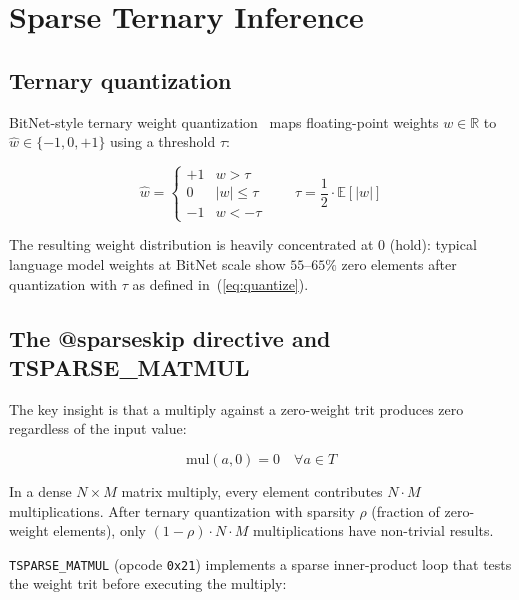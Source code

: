 \documentclass[journal,10pt,twocolumn]{IEEEtran}
\begin{document}
\section{Sparse Ternary Inference}
\label{sec:sparse}

\subsection{Ternary quantization}

BitNet-style ternary weight quantization~\cite{ma2024era} maps floating-point
weights $w \in \mathbb{R}$ to $\hat{w} \in \{-1, 0, +1\}$ using a threshold
$\tau$:

\begin{equation}
  \hat{w} = \begin{cases}
    +1 & w >  \tau \\
     0 & |w| \leq \tau \\
    -1 & w < -\tau
  \end{cases}
  \qquad \tau = \frac{1}{2} \cdot \mathbb{E}[|w|]
  \label{eq:quantize}
\end{equation}

The resulting weight distribution is heavily concentrated at $0$ (hold):
typical language model weights at BitNet scale show $55$–$65\%$ zero elements
after quantization with $\tau$ as defined in~(\ref{eq:quantize}).

\subsection{The @sparseskip directive and TSPARSE\_MATMUL}

The key insight is that a multiply against a zero-weight trit produces zero
regardless of the input value:

\begin{equation}
  \mathrm{mul}(a, 0) = 0 \quad \forall a \in T
  \label{eq:zero-mul}
\end{equation}

In a dense $N \times M$ matrix multiply, every element contributes
$N \cdot M$ multiplications. After ternary quantization with sparsity $\rho$
(fraction of zero-weight elements), only $(1-\rho) \cdot N \cdot M$
multiplications have non-trivial results.

\texttt{TSPARSE\_MATMUL} (opcode \texttt{0x21}) implements a sparse
inner-product loop that tests the weight trit before executing the multiply:
\end{document}
